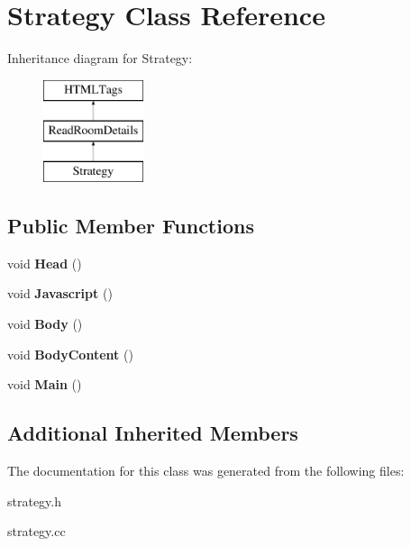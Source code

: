 \hypertarget{classStrategy}{\section{Strategy Class Reference}
\label{classStrategy}
}
Inheritance diagram for Strategy\-:\begin{figure}[H]
\begin{center}
\leavevmode
\includegraphics[height=3.000000cm]{classStrategy}
\end{center}
\end{figure}
\subsection*{Public Member Functions}
\begin{DoxyCompactItemize}
\item 
\hypertarget{classStrategy_a0cb8eed51ebbe2525db7f38be7e7029b}{void {\bfseries Head} ()}\label{classStrategy_a0cb8eed51ebbe2525db7f38be7e7029b}

\item 
\hypertarget{classStrategy_ad2f8797a27e6d992a029659fcc2fa42c}{void {\bfseries Javascript} ()}\label{classStrategy_ad2f8797a27e6d992a029659fcc2fa42c}

\item 
\hypertarget{classStrategy_af06057d962f931b5607a6fb1f0dbb3f5}{void {\bfseries Body} ()}\label{classStrategy_af06057d962f931b5607a6fb1f0dbb3f5}

\item 
\hypertarget{classStrategy_a8af7b8bc100001ccdc945c04844bc3ee}{void {\bfseries Body\-Content} ()}\label{classStrategy_a8af7b8bc100001ccdc945c04844bc3ee}

\item 
\hypertarget{classStrategy_a795aec6d20e2f2d94c0a0c42f62d9c84}{void {\bfseries Main} ()}\label{classStrategy_a795aec6d20e2f2d94c0a0c42f62d9c84}

\end{DoxyCompactItemize}
\subsection*{Additional Inherited Members}


The documentation for this class was generated from the following files\-:\begin{DoxyCompactItemize}
\item 
strategy.\-h\item 
strategy.\-cc\end{DoxyCompactItemize}
